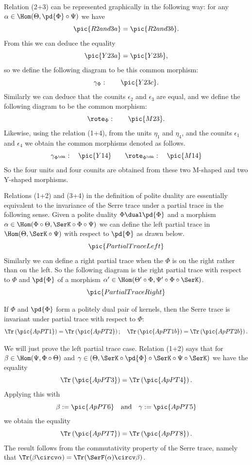 Relation (2+3) can be represented graphically in the following way:
for any $\alpha\in\Hom(\Theta,\pd{\Phi}\circ\Psi)$ we have
\[\pic{R2and3a}=\pic{R2and3b}.\]
From this we can deduce the equality
\[\pic{Y23a}=\pic{Y23b},\]
so we define the following diagram to be this common morphism:
\[\gamma_\Phi:\qquad\pic{Y23c}.\]
Similarly we can deduce that the counits $\epsilon_2$ and $\epsilon_3$
are equal, and we define the following diagram to be the common
morphism:
\[\rote_\Phi:\qquad\pic{M23}.\]
Likewise, using the relation (1+4), from the units $\eta_1$ and
$\eta_4$, and the counits $\epsilon_1$ and $\epsilon_4$ we obtain the
common morphisms denoted as follows.
\[\gamma_{\Phi^\chk}:\quad\pic{Y14}\qquad \rote_{\Phi^\chk}:\quad \pic{M14}\]
So the four units and four counits are obtained from these two
M-shaped and two Y-shaped morphisms.

Relations (1+2) and (3+4) in the definition of polite duality are
essentially equivalent to the invariance of the Serre trace under a
partial trace in the following sense.  Given a polite duality
$\Phi\dual\pd{\Phi}$ and a morphism $\alpha\in
\Hom(\Phi\circ\Theta,\SerK\circ \Phi\circ \Psi)$ we can define the
left partial trace in $\Hom(\Theta,\SerK\circ \Psi)$ with respect to
$\pd{\Phi}$ as drawn below.
\[\pic{PartialTraceLeft}\]
Similarly we can define a right partial trace when the $\Phi$ is on
the right rather than on the left.  So the following diagram is the
right partial trace with respect to $\Phi$ and $\pd{\Phi}$ of a morphism
$\alpha'\in \Hom(\Theta'\circ\Phi,\Psi'\circ \Phi\circ\SerK)$.
\[\pic{PartialTraceRight}\]

\begin{Theorem}
  If $\Phi$ and $\pd{\Phi}$ form a politely dual pair of kernels, then
  the Serre trace is invariant under partial trace with respect to
  $\Phi$:
  \[\Tr\left(\pic{ApPT1}\right)=\Tr\left(\pic{ApPT2}\right);
  \quad \Tr\left(\pic{ApPT1b}\right)=\Tr\left(\pic{ApPT2b}\right).\]
\end{Theorem}

\begin{Proof}
  We will just prove the left partial trace case.  Relation (1+2) says
  that for $\beta\in \Hom (\Psi,\Phi\circ\Theta)$ and $\gamma\in
  (\Theta,\SerK\circ\pd{\Phi}\circ\SerK\circ\Psi\circ\SerK)$ we have the
  equality
  \[\Tr\left(\pic{ApPT3}\right)=\Tr\left(\pic{ApPT4}\right).\]
  Applying this with
  \[\beta:=\pic{ApPT6}\quad\text{and}\quad
  \gamma:=\pic{ApPT5}\] we obtain the equality
  \[\Tr\left(\pic{ApPT7}\right)=\Tr\left(\pic{ApPT8}\right).\]
  The result follows from the commutativity property of the Serre
  trace, namely that $\Tr(\beta\circv \alpha)=\Tr(\SerF(\alpha)\circv
  \beta)$.
\end{Proof}

